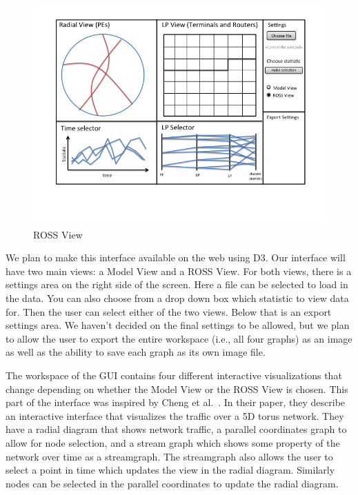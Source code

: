 \documentclass{acm_proc_article-sp}
\begin{document}
\begin{figure}[t]
\centering
   \includegraphics[width=6.5in, clip=true, trim=0 1in 0 0]{../figures/gui-diagram/Slide2.png}
\caption{ROSS View}
\label{ross-view}
\end{figure}

We plan to make this interface available on the web using D3.  Our interface will have two main views: a Model View and a ROSS View.  For both views, there is a settings area on the right side of the screen.  Here a file can be selected to load in the data.  You can also choose from a drop down box which statistic to view data for.  Then the user can select either of the two views.  Below that is an export settings area.  We haven't decided on the final settings to be allowed, but we plan to allow the user to export the entire workspace (i.e., all four graphs) as an image as well as the ability to save each graph as its own image file.  

The workspace of the GUI contains four different interactive visualizations that change depending on whether the Model View or the ROSS View is chosen.  This part of the interface was inspired by Cheng et al.~\cite{cheng}.  In their paper, they describe an interactive interface that visualizes the traffic over a 5D torus network.  They have a radial diagram that shows network traffic, a parallel coordinates graph to allow for node selection, and a stream graph which shows some property of the network over time as a streamgraph.  The streamgraph also allows the user to select a point in time which updates the view in the radial diagram.  Similarly nodes can be selected in the parallel coordinates to update the radial diagram.
\end{document}
